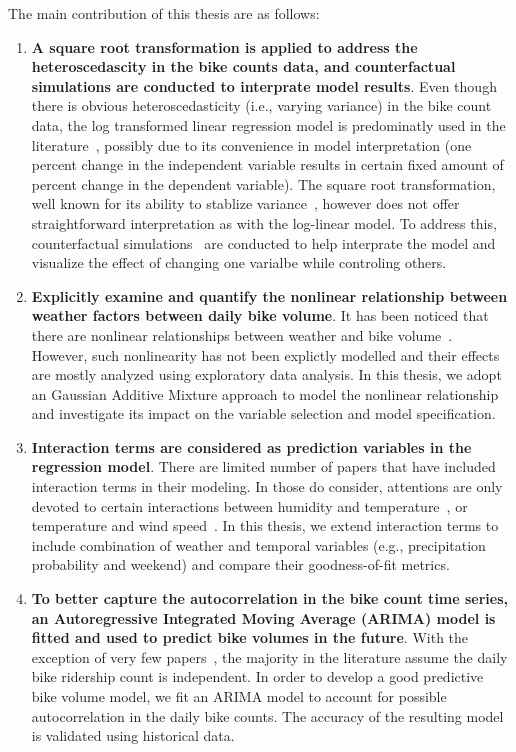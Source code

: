 \documentclass [11pt, proquest] {uwthesis}[2015/03/03]
\begin{document}
The main contribution of this thesis are as follows:
\begin{enumerate}
\item \textbf{A square root transformation is applied to address the heteroscedascity in the bike counts data, and counterfactual simulations are conducted to interprate model results}. Even though there is obvious heteroscedasticity (i.e., varying variance) in the bike count data, the log transformed linear regression model is predominatly used in the literature~\cite{}, possibly due to its convenience in  model interpretation (one percent change in the independent variable results in certain fixed amount of percent change in the dependent variable). The square root transformation, well known for its ability to stablize variance~\cite{}, however does not offer straightforward interpretation as with the log-linear model. To address this, counterfactual simulations~\cite{} are conducted to help interprate the model and visualize the effect of changing one varialbe while controling others. 
\item \textbf{Explicitly examine and quantify the nonlinear relationship between weather factors between daily bike volume}. It has been noticed that there are nonlinear relationships between weather and bike volume~\cite{}. However, such nonlinearity has not been explictly modelled and their effects are mostly analyzed using exploratory data analysis. In this thesis, we adopt an Gaussian Additive Mixture approach to model the nonlinear relationship and investigate its impact on the variable selection and model specification.
\item \textbf{Interaction terms are considered as prediction variables in the regression model}. There are limited number of papers that have included interaction terms in their modeling. In those do consider, attentions are only devoted to certain interactions between humidity and temperature~\cite{}, or temperature and wind speed~\cite{}. In this thesis, we extend interaction terms to include combination of weather and temporal variables (e.g., precipitation probability and weekend) and compare their goodness-of-fit metrics.
\item \textbf{To better capture the autocorrelation in the bike count time series, an Autoregressive Integrated Moving Average (ARIMA) model is fitted and used to predict bike volumes in the future}. With the exception of very few papers~\cite{}, the majority in the literature assume the daily bike ridership count is independent. In order to develop a good predictive bike volume model, we fit an ARIMA model to account for possible autocorrelation in the daily bike counts. The accuracy of the resulting model is validated using historical data.

\end{enumerate}
\end{document}
